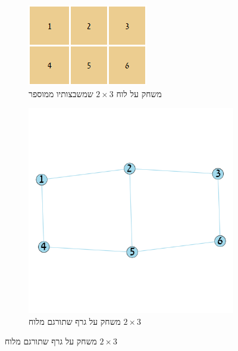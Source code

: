 \documentclass[12pt,leqno]{article}
\theoremstyle{theoremdd}
\begin{document}
\begin{figure}[ht]
    \caption{
        דוגמה
        למשחק על לוח שתורגם למשחק על גרף
        }
    \begin{subfigure}{.5\textwidth}
        \caption{
            משחק על לוח
            $2 \times 3$
            שמשבצותיו
            ממוספר
        }
        \label{2x3_board}
        \centering
        \includegraphics[scale=0.9]{images/2x3_board.PNG}
    \end{subfigure}%
    \begin{subfigure}{.5\textwidth}
        \caption{
            משחק על גרף
            שתורגם מלוח
            $2 \times 3$
        }
        \centering
        \label{2x3_graph}
        \includegraphics[scale=1]{images/2x3_graph.png}
    \end{subfigure}%
\end{figure}
\end{document}
